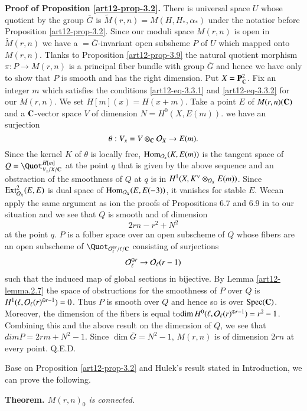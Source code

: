 \medskip
\noindent
{\bfseries  Proof of Proposition \ref{art12-prop-3.2}.} There is universal space $U$ whose quotient by the group $\overline{G}$ is $\tilde{M}(r, n)=M(H, H_{*}, \alpha_{*})$ under the notatior before Proposition \ref{art12-prop-3.2}. Since our moduli space $M(r,n)$ is open in $\tilde{M}(r,n)$ we have a $=\overline{G}$-invariant open subsheme $P$ of $U$ which mapped onto $M(r, n)$. Tlanks to Proposition \ref{art12-prop-3.9} the natural quotient morphism $\pi : P \rightarrow M (r, n)$ is a principal fiber bundle with group $\overline{G}$ and hence we have only to show that $P$ is smooth and has the right dimension. Put $X=\mathbf{P}_{\mathbf{C}}^{2}$. Fix an integer $m$ which satisfies the conditions
\eqref{art12-eq-3.3.1} and \eqref{art12-eq-3.3.2} for our $M(r, n)$. We set $H[m](x) =H(x +m)$. Take a point $E$ of
$M(r, n)(\mathbf{C})$ and a $\mathbf{C}$-vector space $V$ of dimension $N=H^{0}(X, E(m))$. we have an surjection
$$
\theta : V_{x}=V\otimes_{\mathbf{C}} \mathcal{O}_{X}\rightarrow E(m).
$$
Since the kernel $K$ of $\theta$ is locally free, $\operatorname{Hom}_{\mathcal{O}_{x}}(K, E(m))$ is the tangent space of $Q=\Quot_{V_{x}/X/\bC}^{H[m]}$ at the point $q$ that is given by the above sequence and an obstraction of the smoothness of $Q$ at $q$ is in $H^{1}(X, K^{\vee} \otimes_{\mathcal{O}_{X}}E(m))$. Since $\operatorname{Ext}_{\mathcal{O}_{X}}^{2}(E, E)$ is dual space of $\operatorname{Hom}_{\mathcal{O}_{X}}(E, E(-3))$, it vanishes for stable $E$. We\pageoriginale can apply the same argument as ion the proofs of Propositions 6.7 and 6.9 in \cite{art12-key5} to our situation and we see that $Q$ is smooth and of dimension
$$
2rn-r^{2} + N^{2}
$$
at the point $q$. $P$ is a folber space over an open subscheme of $Q$ whose fibers are an open subscheme of $\Quot_{\calO_{\ell}^{\oplus r}/\ell/\bC}$ consisting of surjections
$$
\mathcal{O}_{\ell}^{\oplus r} \rightarrow \mathcal{O}_{\ell}(r-1)
$$ 
such that the induced map of global sections in bijective. By Lemma \ref{art12-lemma.2.7} the space of obstructions for the smoothness of $P$ over $Q$ is\break $H^{1} (\ell,\mathcal{O}_{\ell}(r)^{\oplus r-1}) =0$. Thus $P$ is smooth over $Q$ and hence so is over $\operatorname{Spec}(\mathbf{C})$. Moreover, the dimension of the fibers is equal to\break $\dim H^{0}(\ell, \mathcal{O}_{\ell}(r)^{\oplus r-1})=r^{2}-1 $. Combining this and the above result on the dimension of $Q$, we see that $dim P=2rm +N^{2}-1$. Since $\dim\overline{G}=N^{2}-1$, $M(r,n)$ is of dimension $2rn$ at every point.
\hfill Q.E.D.

Base on Proposition \ref{art12-prop-3.2} and Hulek's result stated in Introduction, we can prove the following.

\medskip
\noindent
{\bfseries {} Theorem. \label{art12-thm-3.10}} \textit{$M(r,n)_{0}$ is connected.}


